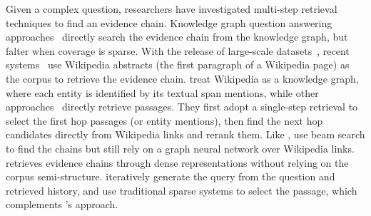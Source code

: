 Given a complex question, researchers have investigated multi-step
retrieval techniques to find an evidence chain. Knowledge graph
question answering approaches~\cite[\emph{inter
    alia}]{talmor-berant-2018-web, zhang2018variational} directly
search the evidence chain from the knowledge graph, but falter when
 coverage is sparse. With the release of large-scale
datasets~\cite{yang+18b}, recent systems~\cite[\emph{inter
    alia}]{nie2019revealing, zhaotransxh2020, asai2020learning,
  Dhingra2020Differentiable} use Wikipedia abstracts (the first paragraph of a
Wikipedia page) as the corpus to retrieve the evidence chain.
%
\citet{Dhingra2020Differentiable} treat Wikipedia as a knowledge graph, where each entity 
is identified by its textual span mentions, while other approaches~\cite{nie2019revealing, zhaotransxh2020}
directly retrieve passages. They first adopt a single-step retrieval to select the first hop passages 
(or entity mentions), then find the 
next hop candidates directly from Wikipedia links and rerank them.
%
%
%
Like \name{}, \citet{asai2020learning} use beam search to find the
chains but still rely on a graph neural network over Wikipedia links.
%
%
\name{} retrieves evidence chains through dense
representations without relying on the corpus semi-structure.
%
\citet{qi2019answering, qi2020retrieve} iteratively generate the query from the 
question and retrieved history, and use traditional sparse 
systems to select the passage, which complements \name{}'s approach.


